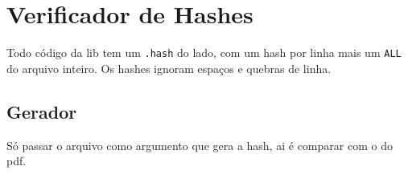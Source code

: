 \section{Verificador de Hashes}
    Todo código da lib tem um \texttt{.hash} do lado, com um hash por linha mais um \texttt{ALL} do arquivo inteiro. Os hashes ignoram espaços e quebras de linha.

    \subsection{Gerador}
    
    Só passar o arquivo como argumento que gera a hash, ai é comparar com o do pdf.

